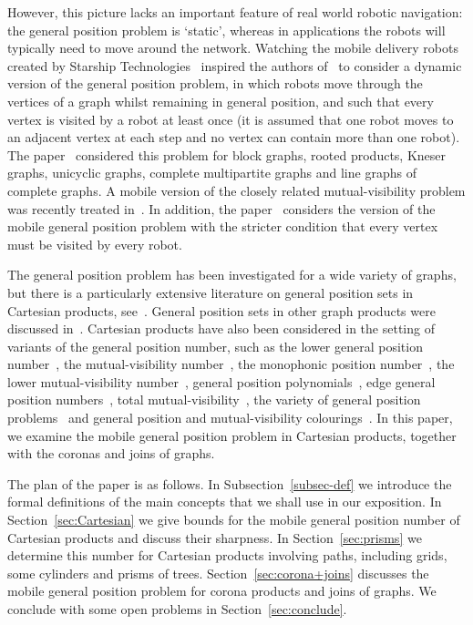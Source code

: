 \documentclass[a4paper,12pt]{article}
\theoremstyle{definition}
\begin{document}
	However, this picture lacks an important feature of real world robotic navigation: the general position problem is `static', whereas in applications the robots will typically need to move around the network. Watching the mobile delivery robots created by Starship Technologies\textregistered\ \cite{starship} inspired the authors of~\cite{klavzar-2023} to consider a dynamic version of the general position problem, in which robots move through the vertices of a graph whilst remaining in general position, and such that every vertex is visited by a robot at least once (it is assumed that one robot moves to an adjacent vertex at each step and no vertex can contain more than one robot). The paper~\cite{klavzar-2023} considered this problem for block graphs, rooted products, Kneser graphs, unicyclic graphs, complete multipartite graphs and line graphs of complete graphs. A mobile version of the closely related mutual-visibility problem was recently treated in~\cite{Dettlaf2024}. In addition, the paper~\cite{Boshar2024} considers the version of the mobile general position problem with the stricter condition that every vertex must be visited by every robot.
	
	The general position problem has been investigated for a wide variety of graphs, but there is a particularly extensive literature on general position sets in Cartesian products, see~\cite{klavzar-2021,KlavzarRus,KorzeVesel,tian-2021a,tian-2021b}. General position sets in other graph products were discussed in~\cite{ghorbani-2021}. Cartesian products have also been considered in the setting of variants of the general position number, such as the lower general position number~\cite{Welton}, the mutual-visibility number~\cite{Cicerone2023,DiStef}, the monophonic position number~\cite{mpproduct}, the lower mutual-visibility number~\cite{lowermv}, general position polynomials~\cite{polynomial}, edge general position numbers~\cite{edgeposition}, total mutual-visibility~\cite{Kuziak2023}, the variety of general position problems~\cite{tian-2024+} and general position and mutual-visibility colourings~\cite{ChaDiSreeThoTui2024+,klavzar-2025+}. In this paper, we examine the mobile general position problem in Cartesian products, together with the coronas and joins of graphs.
	
	The plan of the paper is as follows. In Subsection~\ref{subsec-def} we introduce the formal definitions of the main concepts that we shall use in our exposition. In Section~\ref{sec:Cartesian} we give bounds for the mobile general position number of Cartesian products and discuss their sharpness. In Section~\ref{sec:prisms} we determine this number for Cartesian products involving paths, including grids, some cylinders and prisms of trees. Section~\ref{sec:corona+joins} discusses the mobile general position problem for corona products and joins of graphs. We conclude with some open problems in Section~\ref{sec:conclude}.
	
\end{document}
